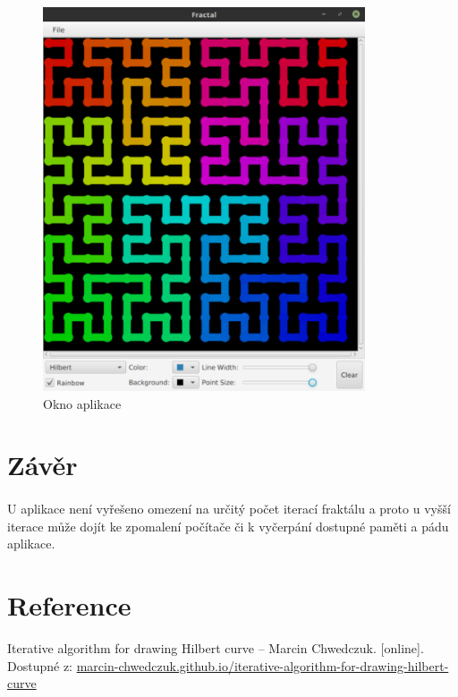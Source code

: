 \documentclass[12pt]{scrartcl}
\begin{document}
\begin{figure}[!ht]
	\centering
	\includegraphics[width=0.85\textwidth,natwidth=1,natheight=1]{app_gui.pdf}
	\caption{Okno aplikace}
\end{figure}

\newpage
\section{Závěr}
\paragraph{}
U aplikace není vyřešeno omezení na určitý počet iterací fraktálu a proto u vyšší iterace může dojít ke zpomalení počítače či k vyčerpání dostupné paměti a pádu aplikace.


\section{Reference}
Iterative algorithm for drawing Hilbert curve – Marcin Chwedczuk. [online].\\ Dostupné z: \href{https://marcin-chwedczuk.github.io/iterative-algorithm-for-drawing-hilbert-curve}{marcin-chwedczuk.github.io/iterative-algorithm-for-drawing-hilbert-curve}
\end{document}
